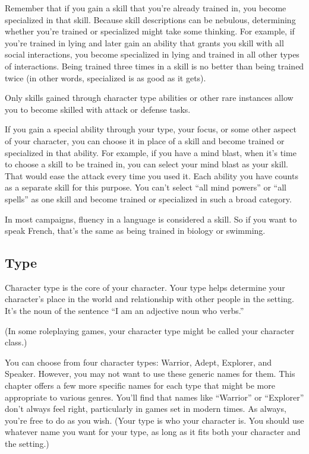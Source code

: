 \begin{multicols}{2}
Remember that if you gain a skill that you’re already trained in, you become specialized in that skill. Because skill descriptions can be nebulous, determining whether you’re trained or specialized might take some thinking. For example, if you’re trained in lying and later gain an ability that grants you skill with all social interactions, you become specialized in lying and trained in all other types of interactions. Being trained three times in a skill is no better than being trained twice (in other words, specialized is as good as it gets).

Only skills gained through character type abilities or other rare instances allow you to become skilled with attack or defense tasks.

If you gain a special ability through your type, your focus, or some other aspect of your character, you can choose it in place of a skill and become trained or specialized in that ability. For example, if you have a mind blast, when it’s time to choose a skill to be trained in, you can select your mind blast as your skill. That would ease the attack every time you used it. Each ability you have counts as a separate skill for this purpose. You can’t select “all mind powers” or “all spells” as one skill and become trained or specialized in such a broad category.

In most campaigns, fluency in a language is considered a skill. So if you want to speak French, that’s the same as being trained in biology or swimming.

\subsection{Type}

Character type is the core of your character. Your type helps determine your character’s place in the world and relationship with other people in the setting. It’s the noun of the sentence “I am an adjective noun who verbs.”

(In some roleplaying games, your character type might be called your character class.)

You can choose from four character types: Warrior, Adept, Explorer, and Speaker. However, you may not want to use these generic names for them. This chapter offers a few more specific names for each type that might be more appropriate to various genres. You’ll find that names like “Warrior” or “Explorer” don’t always feel right, particularly in games set in modern times. As always, you’re free to do as you wish. (Your type is who your character is. You should use whatever name you want for your type, as long as it fits both your character and the setting.)


\end{multicols}
